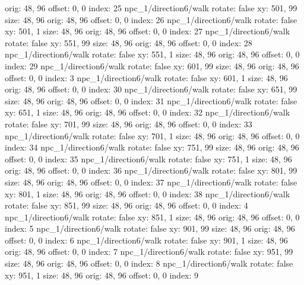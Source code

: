   orig: 48, 96
  offset: 0, 0
  index: 25
npc_1/direction6/walk
  rotate: false
  xy: 501, 99
  size: 48, 96
  orig: 48, 96
  offset: 0, 0
  index: 26
npc_1/direction6/walk
  rotate: false
  xy: 501, 1
  size: 48, 96
  orig: 48, 96
  offset: 0, 0
  index: 27
npc_1/direction6/walk
  rotate: false
  xy: 551, 99
  size: 48, 96
  orig: 48, 96
  offset: 0, 0
  index: 28
npc_1/direction6/walk
  rotate: false
  xy: 551, 1
  size: 48, 96
  orig: 48, 96
  offset: 0, 0
  index: 29
npc_1/direction6/walk
  rotate: false
  xy: 601, 99
  size: 48, 96
  orig: 48, 96
  offset: 0, 0
  index: 3
npc_1/direction6/walk
  rotate: false
  xy: 601, 1
  size: 48, 96
  orig: 48, 96
  offset: 0, 0
  index: 30
npc_1/direction6/walk
  rotate: false
  xy: 651, 99
  size: 48, 96
  orig: 48, 96
  offset: 0, 0
  index: 31
npc_1/direction6/walk
  rotate: false
  xy: 651, 1
  size: 48, 96
  orig: 48, 96
  offset: 0, 0
  index: 32
npc_1/direction6/walk
  rotate: false
  xy: 701, 99
  size: 48, 96
  orig: 48, 96
  offset: 0, 0
  index: 33
npc_1/direction6/walk
  rotate: false
  xy: 701, 1
  size: 48, 96
  orig: 48, 96
  offset: 0, 0
  index: 34
npc_1/direction6/walk
  rotate: false
  xy: 751, 99
  size: 48, 96
  orig: 48, 96
  offset: 0, 0
  index: 35
npc_1/direction6/walk
  rotate: false
  xy: 751, 1
  size: 48, 96
  orig: 48, 96
  offset: 0, 0
  index: 36
npc_1/direction6/walk
  rotate: false
  xy: 801, 99
  size: 48, 96
  orig: 48, 96
  offset: 0, 0
  index: 37
npc_1/direction6/walk
  rotate: false
  xy: 801, 1
  size: 48, 96
  orig: 48, 96
  offset: 0, 0
  index: 38
npc_1/direction6/walk
  rotate: false
  xy: 851, 99
  size: 48, 96
  orig: 48, 96
  offset: 0, 0
  index: 4
npc_1/direction6/walk
  rotate: false
  xy: 851, 1
  size: 48, 96
  orig: 48, 96
  offset: 0, 0
  index: 5
npc_1/direction6/walk
  rotate: false
  xy: 901, 99
  size: 48, 96
  orig: 48, 96
  offset: 0, 0
  index: 6
npc_1/direction6/walk
  rotate: false
  xy: 901, 1
  size: 48, 96
  orig: 48, 96
  offset: 0, 0
  index: 7
npc_1/direction6/walk
  rotate: false
  xy: 951, 99
  size: 48, 96
  orig: 48, 96
  offset: 0, 0
  index: 8
npc_1/direction6/walk
  rotate: false
  xy: 951, 1
  size: 48, 96
  orig: 48, 96
  offset: 0, 0
  index: 9


